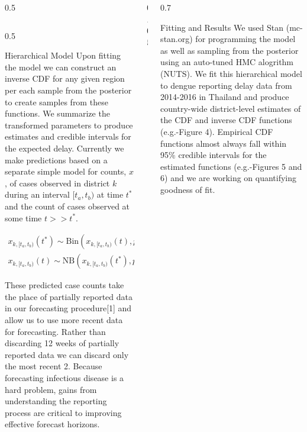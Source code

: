 \documentclass[final]{beamer}
\newlength{\onecolwid}
\begin{document}
\begin{frame}[t]
\begin{columns}[t]
\begin{column}{0.5\onecolwid}
\begin{column}{0.5\onecolwid}
\begin{block}{Hierarchical Model}
Upon fitting the model we can construct an inverse CDF for any given region per each sample from the posterior to create samples from these functions.  We summarize the transformed parameters to produce estimates and credible intervals for the expected delay.  Currently we make predictions based on a separate simple model for counts, $x$, of cases observed in district $k$ during an interval $[t_a,t_b)$ at time $t^*$ and the count of cases observed at some time $t >> t^*$.

\begin{align*}
x_{k,[t_a,t_b)}(t^*) \sim \text{Bin}(x_{k, [t_a,t_b)}(t),p_{k, [t_a,t_b)}(t^*)) \\
x_{k,[t_a,t_b)}(t) \sim \text{NB}(x_{k,[t_a,t_b)}(t^*),p_{k,[t_a,t_b)}(t^*))
\end{align*}


\vspace{0.2in}

These predicted case counts take the place of partially reported data in our forecasting procedure[1] and allow us to use more recent data for forecasting.  Rather than discarding 12 weeks of partially reported data we can discard only the most recent 2.  Because forecasting infectious disease is a hard problem, gains from understanding the reporting process are critical to improving effective forecast horizons.

\end{block}
\end{column}


\end{column} %

\begin{column}{0.05\onecolwid}
\end{column}

\begin{column}{0.7\onecolwid} 


\begin{block}{Fitting and Results}
We used Stan (mc-stan.org) for programming the model as well as sampling from the posterior using an auto-tuned HMC alogrithm (NUTS).  We fit this hierarchical model to dengue reporting delay data from 2014-2016 in Thailand and produce country-wide district-level estimates of the CDF and inverse CDF functions (e.g.-Figure 4).  Empirical CDF functions almost always fall within 95\% credible intervals for the estimated functions (e.g.-Figures 5 and 6) and we are working on quantifying goodness of fit.

\vspace{0.2in}


\end{block}
\end{column}
\end{columns}
\end{frame}
\end{document}
